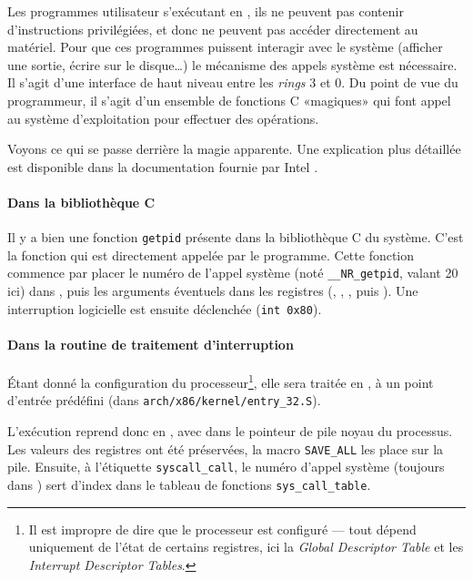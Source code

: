 \label{sec:impl-syscall}

Les programmes utilisateur s'exécutant en , ils ne peuvent pas contenir
d'instructions privilégiées, et donc ne peuvent pas accéder directement au
matériel. Pour que ces programmes puissent interagir avec le système (afficher
une sortie, écrire sur le disque…) le mécanisme des appels système est
nécessaire. Il s'agit d'une interface de haut niveau entre les \emph{rings} 3 et
0. Du point de vue du programmeur, il s'agit d'un ensemble de fonctions C
«magiques» qui font appel au système d'exploitation pour effectuer des
opérations.

Voyons ce qui se passe derrière la magie apparente. Une explication plus
détaillée est disponible dans la documentation fournie par Intel
\cite{intelsys}.

\paragraph{Dans la bibliothèque C}

Il y a bien une fonction \texttt{getpid} présente dans la bibliothèque C du
système. C'est la fonction qui est directement appelée par le programme. Cette
fonction commence par placer le numéro de l'appel système (noté
\texttt{\_\_NR\_getpid}, valant 20 ici) dans \eax, puis les arguments éventuels
dans les registres (\ebx, \ecx, \edx, \esi{} puis \edi). Une interruption
logicielle est ensuite déclenchée (\verb!int 0x80!).

\paragraph{Dans la routine de traitement d'interruption}

Étant donné la configuration du processeur\footnote{Il est impropre de dire que
le processeur est configuré --- tout dépend uniquement de l'état de certains
registres, ici la \emph{Global Descriptor Table} et les \emph{Interrupt
Descriptor Tables}.}, elle sera traitée en , à un point d'entrée
prédéfini (dans \verb!arch/x86/kernel/entry_32.S!).


L'exécution reprend donc en , avec dans \esp{} le pointeur de pile noyau
du processus. Les valeurs des registres ont été préservées, la macro
\texttt{SAVE\_ALL} les place sur la pile. Ensuite, à l'étiquette
\texttt{syscall\_call}, le numéro d'appel système (toujours dans \eax) sert
d'index dans le tableau de fonctions \texttt{sys\_call\_table}.


